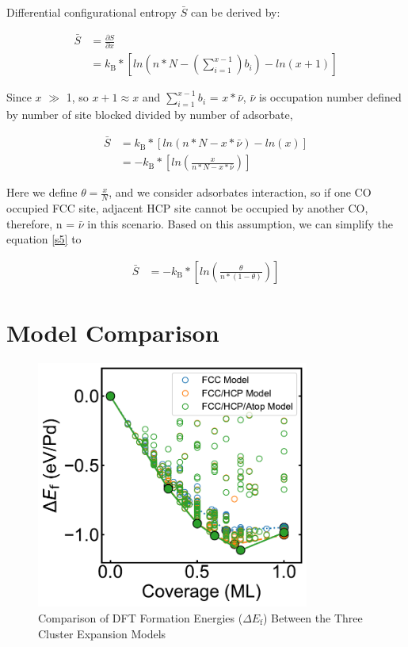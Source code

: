 \documentclass[11pt]{article}
\begin{document}
\noindent
Differential configurational entropy $\bar{S}$ can be derived by:

\begin{equation}
\begin{aligned}
\bar{S} & = \frac{\partial S}{\partial x} \\
              & =   k_\mathrm{B}* [ln(n*N-(\sum_{i=1}^{x-1})b_{i})-ln(x+1)]
\end{aligned}
\end{equation}

\noindent
Since $x$ $\gg$ 1, so $x+1 \approx x$ and $\sum_{i=1}^{x-1}b_{i}$ = $x*\bar{\nu}$, $\bar{\nu}$ is occupation number defined by number of site blocked divided by number of adsorbate,

\begin{equation} \label{s5}
\begin{aligned}
\bar{S} & = k_\mathrm{B}* [ln(n*N-x*\bar{\nu})-ln(x)] \\
              & = -k_\mathrm{B}* [ln(\frac{x}{n*N-x*\bar{\nu}})]
\end{aligned}
\end{equation}

\noindent
Here we define $\theta = \frac{x}{N}$, and we consider adsorbates interaction, so if one CO occupied FCC site, adjacent HCP site cannot be occupied by another CO, therefore, n = $\bar{\nu}$ in this scenario. Based on this assumption, we can simplify the equation \ref{s5} to

\begin{equation}
\begin{aligned}
\bar{S}  & = -k_\mathrm{B}* [ln(\frac{\theta}{n*(1-\theta)})]
\end{aligned}
\end{equation}

\clearpage
\section{Model Comparison}

\begin{figure} [ht]
\centering
\includegraphics[width=0.8\textwidth]{Figure/FE-com.pdf}
\caption{Comparison of DFT Formation Energies ($\Delta E_\mathrm{f}$) Between the Three Cluster Expansion Models}
\label{DFTcompare}
\end{figure}
\end{document}

